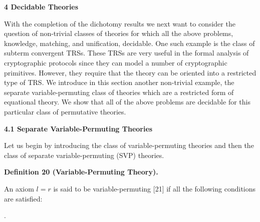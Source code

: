 \documentclass[10pt,a4paper]{amsart}
\begin{document}
 
 
 

 
\par\medskip\noindent\textbf{4 Decidable Theories}\par
 
 
With the completion of the dichotomy results we next want to consider the question of non-trivial classes of theories for which all the above problems, knowledge, matching, and unification, decidable. One such example is the class of subterm convergent TRSs. These TRSs are very useful in the formal analysis of cryptographic protocols since they can model a number of cryptographic primitives. However, they require that the theory can be oriented into a restricted type of TRS. We introduce in this section another non-trivial example, the separate variable-permuting class of theories which are a restricted form of equational theory. We show that all of the above problems are decidable for this particular class of permutative theories.\par
 
 
 
\par\medskip\noindent\textbf{4.1 Separate Variable-Permuting Theories}\par
 
 
Let us begin by introducing the class of variable-permuting theories and then the class of separate variable-permuting (SVP) theories.\par
 
 
 
\par\medskip\noindent\textbf{Definition 20 (Variable-Permuting Theory).}\par
 
 
An axiom $l=r$ is said to be variable-permuting [21] if all the following conditions are satisfied:\par
  
\par{}. 
 
\end{document}
